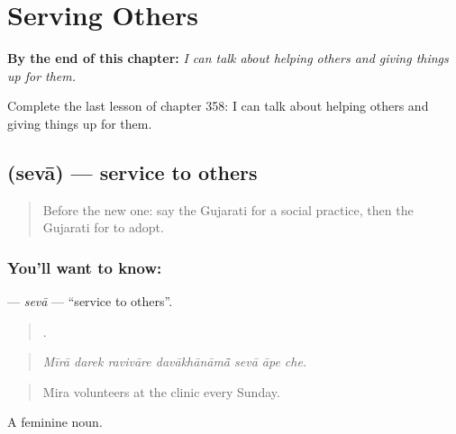 
\chapter{Serving Others}
\label{ch:gu-serving-others}

\begin{chapteropening}
\textbf{By the end of this chapter:} \emph{I can talk about helping others and giving things up for them.}

Complete the last lesson of chapter 358: I can talk about helping others and giving things up for them.
\end{chapteropening}

\section[\texorpdfstring{\gu{સેવા} (sevā)}{સેવા (sevā)}]{ (sevā) — service to others}

\label{lesson:GU-C358-seva}



\begin{quote}
Before the new one: say the Gujarati for a social practice, then the Gujarati for to adopt.
\end{quote}

\subsection*{You'll want to know: }
\textbf{} — \emph{sevā} — \textquotedblleft{}service to others\textquotedblright{}.

\begin{quote}
      .
\end{quote}

\begin{quote}
\emph{Mīrā darek ravivāre davākhānāmā̃ sevā āpe che.}
\end{quote}

\begin{quote}
Mira volunteers at the clinic every Sunday.
\end{quote}

A feminine noun.

